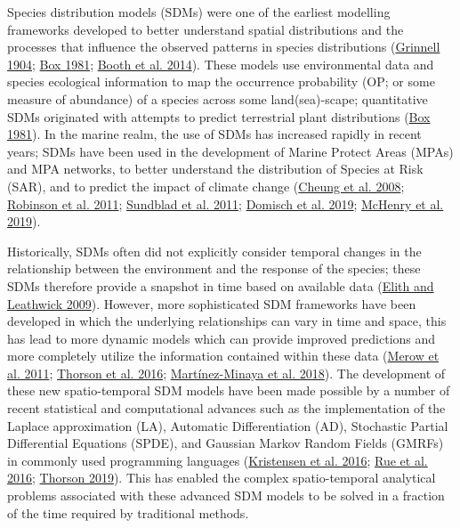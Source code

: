 \documentclass[
]{article}
\begin{document}
Species distribution models (SDMs) were one of the earliest modelling frameworks developed to better understand spatial distributions and the processes that influence the observed patterns in species distributions (\protect\hyperlink{ref-grinnellOriginDistributionChestNutBacked1904}{Grinnell 1904}; \protect\hyperlink{ref-boxPredictingPhysiognomicVegetation1981}{Box 1981}; \protect\hyperlink{ref-boothBioclimFirstSpecies2014}{Booth et al. 2014}). These models use environmental data and species ecological information to map the occurrence probability (OP; or some measure of abundance) of a species across some land(sea)-scape; quantitative SDMs originated with attempts to predict terrestrial plant distributions (\protect\hyperlink{ref-boxPredictingPhysiognomicVegetation1981}{Box 1981}). In the marine realm, the use of SDMs has increased rapidly in recent years; SDMs have been used in the development of Marine Protect Areas (MPAs) and MPA networks, to better understand the distribution of Species at Risk (SAR), and to predict the impact of climate change (\protect\hyperlink{ref-cheungApplicationMacroecologicalTheory2008}{Cheung et al. 2008}; \protect\hyperlink{ref-robinsonPushingLimitsMarine2011}{Robinson et al. 2011}; \protect\hyperlink{ref-sundbladEcologicalCoherenceMarine2011}{Sundblad et al. 2011}; \protect\hyperlink{ref-domischSpatiallyExplicitSpecies2019}{Domisch et al. 2019}; \protect\hyperlink{ref-mchenryProjectingMarineSpecies2019}{McHenry et al. 2019}).

Historically, SDMs often did not explicitly consider temporal changes in the relationship between the environment and the response of the species; these SDMs therefore provide a snapshot in time based on available data (\protect\hyperlink{ref-elithSpeciesDistributionModels2009}{Elith and Leathwick 2009}). However, more sophisticated SDM frameworks have been developed in which the underlying relationships can vary in time and space, this has lead to more dynamic models which can provide improved predictions and more completely utilize the information contained within these data (\protect\hyperlink{ref-merowDevelopingDynamicMechanistic2011}{Merow et al. 2011}; \protect\hyperlink{ref-thorsonJointDynamicSpecies2016}{Thorson et al. 2016}; \protect\hyperlink{ref-martinez-minayaSpeciesDistributionModeling2018}{Martínez-Minaya et al. 2018}). The development of these new spatio-temporal SDM models have been made possible by a number of recent statistical and computational advances such as the implementation of the Laplace approximation (LA), Automatic Differentiation (AD), Stochastic Partial Differential Equations (SPDE), and Gaussian Markov Random Fields (GMRFs) in commonly used programming languages (\protect\hyperlink{ref-kristensenTMBAutomaticDifferentiation2016}{Kristensen et al. 2016}; \protect\hyperlink{ref-rueBayesianComputingINLA2016}{Rue et al. 2016}; \protect\hyperlink{ref-thorsonGuidanceDecisionsUsing2019}{Thorson 2019}). This has enabled the complex spatio-temporal analytical problems associated with these advanced SDM models to be solved in a fraction of the time required by traditional methods.
\end{document}
